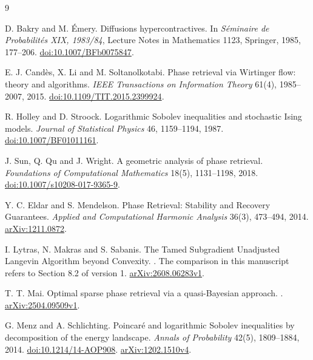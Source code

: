 \documentclass[11pt,letterpaper]{article}
\numberwithin{equation}{section}
\theoremstyle{remark}
\newcommand{\1}{\mathbf 1}
\begin{document}
\begin{thebibliography}{9}

D. Bakry and M. \'Emery. \newblock Diffusions hypercontractives. \newblock In \emph{S\'eminaire de Probabilit\'es XIX, 1983/84}, Lecture Notes in Mathematics 1123, Springer, 1985, 177--206. \newblock \href{https://doi.org/10.1007/BFb0075847}{doi:10.1007/BFb0075847}.

E. J. Cand\`es, X. Li and M. Soltanolkotabi. \newblock Phase retrieval via Wirtinger flow: theory and algorithms. \newblock \emph{IEEE Transactions on Information Theory} 61(4), 1985--2007, 2015. \newblock \href{https://doi.org/10.1109/TIT.2015.2399924}{doi:10.1109/TIT.2015.2399924}.

R. Holley and D. Stroock. \newblock Logarithmic Sobolev inequalities and stochastic Ising models. \newblock \emph{Journal of Statistical Physics} 46, 1159--1194, 1987. \newblock \href{https://doi.org/10.1007/BF01011161}{doi:10.1007/BF01011161}.

J. Sun, Q. Qu and J. Wright. \newblock A geometric analysis of phase retrieval. \newblock \emph{Foundations of Computational Mathematics} 18(5), 1131--1198, 2018. \newblock \href{https://doi.org/10.1007/s10208-017-9365-9}{doi:10.1007/s10208-017-9365-9}.

Y. C. Eldar and S. Mendelson.
\newblock Phase Retrieval: Stability and Recovery Guarantees.
\newblock \emph{Applied and Computational Harmonic Analysis} 36(3), 473--494, 2014.
\newblock \href{https://arxiv.org/abs/1211.0872}{arXiv:1211.0872}.

I. Lytras, N. Makras and S. Sabanis.
\newblock The Tamed Subgradient Unadjusted Langevin Algorithm beyond Convexity.
. The comparison in this manuscript refers to Section 8.2 of version 1.
\newblock \href{https://arxiv.org/html/2608.06283v1}{arXiv:2608.06283v1}.

T. T. Mai.
\newblock Optimal sparse phase retrieval via a quasi-Bayesian approach.
.
\newblock \href{https://arxiv.org/html/2504.09509v1}{arXiv:2504.09509v1}.

G. Menz and A. Schlichting.
\newblock Poincar\'e and logarithmic Sobolev inequalities by decomposition of the energy landscape.
\newblock \emph{Annals of Probability} 42(5), 1809--1884, 2014.
\newblock \href{https://doi.org/10.1214/14-AOP908}{doi:10.1214/14-AOP908}.
\newblock \href{https://arxiv.org/abs/1202.1510v4}{arXiv:1202.1510v4}.


\end{thebibliography}
\end{document}
